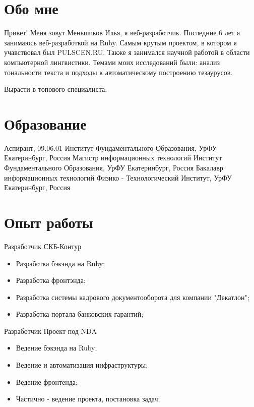 \documentclass[11pt,a4paper]{moderncv}
\begin{document}
\maketitle

\section{Обо мне}
 {
  Привет! Меня зовут Меньшиков Илья, я веб-разработчик.
}
\cvitem{} {
  Последние 6 лет я занимаюсь веб-разработкой на Ruby. Самым крутым проектом, в котором я учавствовал был PULSCEN.RU.
}
\cvitem{} {
  Также я занимался научной работой в области компьютерной лингвистики. Темами моих исследований были: анализ тональности текста и подходы к автоматическому построению тезаурусов.
}

 {
  Вырасти в топового специалиста.
}


\section{Образование}

  {Аспирант, 09.06.01}
  {Институт Фундаментального Образования, УрФУ}
  {Екатеринбург, Россия}
{}{}
  {Магистр информационных технологий}
  {Институт Фундаментального Образования, УрФУ}
  {Екатеринбург, Россия}
{}{}
  {Бакалавр информационных технологий}
  {Физико - Технологический Институт, УрФУ}
  {Екатеринбург, Россия}
{}{}

\section{Опыт работы}

  {Разработчик}{}
  {СКБ-Контур}
  {}
{
\begin{itemize}
  \item Разработка бэкэнда на Ruby;
  \item Разработка фронтэнда;
  \item Разработка системы кадрового документооборота для компании "Декатлон";
  \item Разработка портала банковских гарантий;
\end{itemize}
}

  {Разработчик}{}
  {Проект под NDA}
  {}
{
\begin{itemize}
  \item Ведение бэкэнда на Ruby;
  \item Ведение и автоматизация инфраструктуры;
  \item Ведение фронтенда;
  \item Частично - ведение проекта, постановка задач;
\end{itemize}
}
\end{document}
